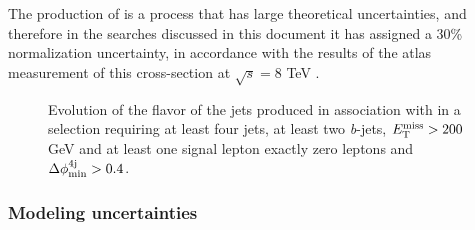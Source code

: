 The production of \tthf is a process that has large theoretical uncertainties, and therefore in the searches discussed in this document 
it has assigned a 30\% normalization uncertainty, in accordance with the results of the \gls{atlas} measurement of this cross-section 
at $\sqrt{s}= 8$ TeV \cite{TOPQ-2014-10}.

\begin{figure}[htb]
\centering 
{}
\caption{Evolution of the flavor of the jets produced in association with \ttbar in a selection requiring at least four jets, at least two \textit{b}-jets, $E_{\rm T}^{\mathrm{miss}}>200$ GeV and  at least one signal lepton  exactly zero leptons and $\Delta\phi_{\rm{min}}^{4{\rm{j}}} > 0.4$.}\label{fig:ttbar_HF_bjets}
\end{figure}


\subsubsection*{Modeling uncertainties}

